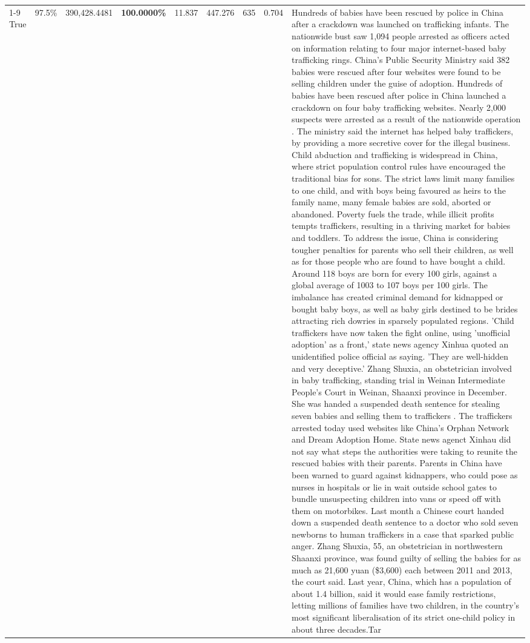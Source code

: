 \begin{table}[H]
\begin{tabular}{lllrlllll}
\cline{1-9}
True & 97.5\% & 390,428.4481 & \bfseries \color{red} 100.0000\% & 11.837 & 447.276 & 635 & 0.704 & Hundreds of babies have been rescued by police in China after a crackdown was launched on trafficking infants. The nationwide bust saw 1,094 people arrested as officers acted on information relating to four major internet-based baby trafficking rings. China's Public Security Ministry said 382 babies were rescued after four websites were found to be selling children under the guise of adoption. Hundreds of babies have been rescued after police in China launched a crackdown on four baby trafficking websites. Nearly 2,000 suspects were arrested as a result of the nationwide operation . The ministry said the internet has helped baby traffickers, by providing a more secretive cover for the illegal business. Child abduction and trafficking is widespread in China, where strict population control rules have encouraged the traditional bias for sons. The strict laws limit many families to one child, and with boys being favoured as heirs to the family name, many female babies are sold, aborted or abandoned. Poverty fuels the trade, while illicit profits tempts traffickers, resulting in a thriving market for babies and toddlers. To address the issue, China is considering tougher penalties for parents who sell their children, as well as for those people who are found to have bought a child. Around 118 boys are born for every 100 girls, against a global average of 1003 to 107 boys per 100 girls. The imbalance has created criminal demand for kidnapped or bought baby boys, as well as baby girls destined to be brides attracting rich dowries in sparsely populated regions. 'Child traffickers have now taken the fight online, using 'unofficial adoption' as a front,' state news agency Xinhua quoted an unidentified police official as saying. 'They are well-hidden and very deceptive.' Zhang Shuxia, an obstetrician involved in baby trafficking, standing trial in Weinan Intermediate People's Court in Weinan, Shaanxi province in December. She was handed a suspended death sentence for stealing seven babies and selling them to traffickers . The traffickers arrested today used websites like China's Orphan Network and Dream Adoption Home. State news agenct Xinhau did not say what steps the authorities were taking to reunite the rescued babies with their parents. Parents in China have been warned to guard against kidnappers, who could pose as nurses in hospitals or lie in wait outside school gates to bundle unsuspecting children into vans or speed off with them on motorbikes. Last month a Chinese court handed down a suspended death sentence to a doctor who sold seven newborns to human traffickers in a case that sparked public anger. Zhang Shuxia, 55, an obstetrician in northwestern Shaanxi province, was found guilty of selling the babies for as much as 21,600 yuan (\$3,600) each between 2011 and 2013, the court said. Last year, China, which has a population of about 1.4 billion, said it would ease family restrictions, letting millions of families have two children, in the country's most significant liberalisation of its strict one-child policy in about three decades.Tar \\

\end{tabular}
\end{table}
